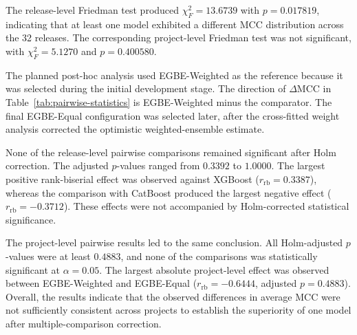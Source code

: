 \documentclass[conference]{IEEEtran}
\begin{document}
The release-level Friedman test produced
\(\chi^{2}_{F}=13.6739\) with \(p=0.017819\), indicating that at least
one model exhibited a different MCC distribution across the 32
releases. The corresponding project-level Friedman test was not
significant, with \(\chi^{2}_{F}=5.1270\) and \(p=0.400580\).

The planned post-hoc analysis used EGBE-Weighted as the reference
because it was selected during the initial development stage. The
direction of \(\Delta\mathrm{MCC}\) in
Table~\ref{tab:pairwise-statistics} is EGBE-Weighted minus the
comparator. The final EGBE-Equal configuration was selected later,
after the cross-fitted weight analysis corrected the optimistic
weighted-ensemble estimate.

\begin{table}[H]
\caption{Release-Level Wilcoxon Tests Against EGBE-Weighted}
\label{tab:pairwise-statistics}
\centering
\setlength{\tabcolsep}{3.2pt}
\end{table}

None of the release-level pairwise comparisons remained significant
after Holm correction. The adjusted \(p\)-values ranged from \(0.3392\)
to \(1.0000\). The largest positive rank-biserial effect was observed
against XGBoost (\(r_{\mathrm{rb}}=0.3387\)), whereas the comparison
with CatBoost produced the largest negative effect
(\(r_{\mathrm{rb}}=-0.3712\)). These effects were not accompanied by
Holm-corrected statistical significance.

The project-level pairwise results led to the same conclusion. All
Holm-adjusted \(p\)-values were at least \(0.4883\), and none of the
comparisons was statistically significant at \(\alpha=0.05\). The
largest absolute project-level effect was observed between
EGBE-Weighted and EGBE-Equal
(\(r_{\mathrm{rb}}=-0.6444\), adjusted \(p=0.4883\)). Overall, the
results indicate that the observed differences in average MCC were
not sufficiently consistent across projects to establish the
superiority of one model after multiple-comparison correction.
\end{document}
